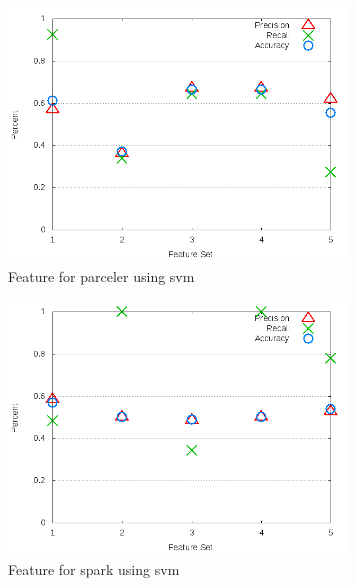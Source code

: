 \begin{figure}[!t]
\centering
\includegraphics[width=0.8\textwidth]{images/svm/test_3/parceler_sample_range.png}
\caption{Feature for parceler using \gls{svm}}
\label{fig:test_3_parceler_svm}
\end{figure}

\clearpage
\begin{figure}[!t]
\centering
\includegraphics[width=0.8\textwidth]{images/svm/test_3/spark_sample_range.png}
\caption{Feature for spark using \gls{svm}}
\label{fig:test_3_spark_svm}
\end{figure}

